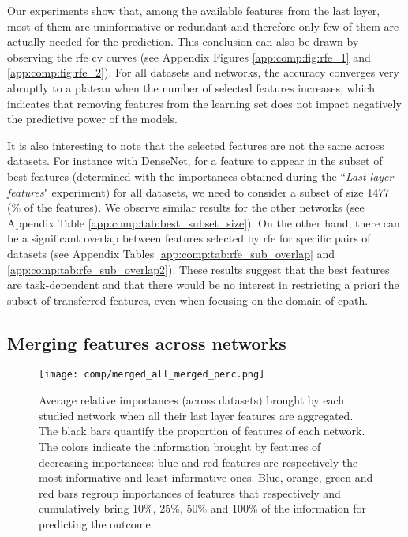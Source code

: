 Our experiments show that, among the available features from the last layer, most of them are uninformative or redundant and therefore only few of them are actually needed for the prediction. This conclusion can also be drawn by observing the \acrlong{rfe} \acrlong{cv} curves (see Appendix Figures \ref{app:comp:fig:rfe_1} and 
\ref{app:comp:fig:rfe_2}). For all datasets and networks, the accuracy converges very abruptly to a plateau when the number of selected features increases, which indicates that removing features from the learning set does not impact negatively the predictive power of the models.

It is also interesting to note that the selected features are not the same across datasets. For instance with DenseNet, for a feature to appear in the subset of best features (determined with the importances obtained during the ``\textit{Last layer features}" experiment) for all datasets, we need to consider a subset of size 1477 (\% of the features). We observe similar results for the other networks (see Appendix Table \ref{app:comp:tab:best_subset_size}). On the other hand, there can be a significant overlap between features selected by \acrshort{rfe} for specific pairs of datasets (see Appendix Tables \ref{app:comp:tab:rfe_sub_overlap} and \ref{app:comp:tab:rfe_sub_overlap2}). These results suggest that the best features are task-dependent and that there would be no interest in restricting a priori the subset of transferred features, even when focusing on the domain of \acrlong{cpath}.
 




\subsection{Merging features across networks}
\label{ssec:comp:exp_merge_net}


\begin{figure}
    \centering
    \texttt{[image: comp/merged\_all\_merged\_perc.png]}
    \caption{Average relative importances (across datasets) brought by each studied network when all their last layer features are aggregated. The black bars quantify the proportion of features of each network. The colors indicate the information brought by features of decreasing importances: blue and red features are respectively the most informative and least informative ones. Blue, orange, green and red bars regroup importances of features that respectively and cumulatively bring 10\%, 25\%, 50\% and 100\% of the information for predicting the outcome.}
    \label{fig:comp:models_merged_avg_imp}
\end{figure} 


